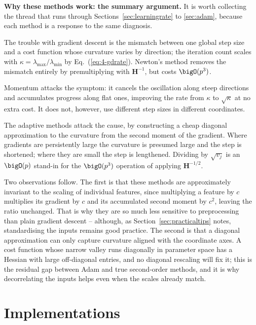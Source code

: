 \begin{notebox}
\textbf{Why these methods work: the summary argument.}  It is worth collecting
the thread that runs through Sections~\ref{sec:learningrate} to
\ref{sec:adam}, because each method is a response to the same diagnosis.

The trouble with gradient descent is the mismatch between one global step size
and a cost function whose curvature varies by direction; the iteration count
scales with $\kappa=\lambda_{\max}/\lambda_{\min}$ by
Eq.~(\ref{eq:4-gdrate}).  Newton's method removes the mismatch entirely by
premultiplying with $\bm{H}^{-1}$, but costs $\bigO(p^{3})$.

Momentum attacks the symptom: it cancels the oscillation along steep
directions and accumulates progress along flat ones, improving the rate from
$\kappa$ to $\sqrt{\kappa}$ at no extra cost.  It does not, however, use
different step sizes in different coordinates.

The adaptive methods attack the cause, by constructing a cheap diagonal
approximation to the curvature from the second moment of the gradient.  Where
gradients are persistently large the curvature is presumed large and the step
is shortened; where they are small the step is lengthened.  Dividing by
$\sqrt{v_j}$ is an $\bigO(p)$ stand-in for the $\bigO(p^{3})$ operation of
applying $\bm{H}^{-1/2}$.

Two observations follow.  The first is that these methods are approximately
invariant to the scaling of individual features, since multiplying a feature
by $c$ multiplies its gradient by $c$ and its accumulated second moment by
$c^{2}$, leaving the ratio unchanged.  That is why they are so much less
sensitive to preprocessing than plain gradient descent -- although, as
Section~\ref{sec:practicaltips} notes, standardising the inputs remains good
practice.  The second is that a diagonal approximation can only capture
curvature aligned with the coordinate axes.  A cost function whose narrow
valley runs diagonally in parameter space has a Hessian with large
off-diagonal entries, and no diagonal rescaling will fix it; this is the
residual gap between Adam and true second-order methods, and it is why
decorrelating the inputs helps even when the scales already match.
\end{notebox}

\section{Implementations}
\label{sec:adaptivecode}

